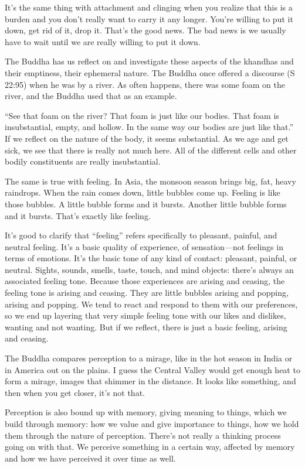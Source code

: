 It’s the same thing with attachment and clinging when you realize that
this is a burden and you don’t really want to carry it any longer.
You’re willing to put it down, get rid of it, drop it. That’s the good
news. The bad news is we usually have to wait until we are really
willing to put it down.

The Buddha has us reflect on and investigate these aspects of the
khandhas and their emptiness, their ephemeral nature. The Buddha once
offered a discourse (S 22:95) when he was by a river. As often happens,
there was some foam on the river, and the Buddha used that as an
example.

“See that foam on the river? That foam is just like our bodies. That
foam is insubstantial, empty, and hollow. In the same way our bodies are
just like that.” If we reflect on the nature of the body, it seems
substantial. As we age and get sick, we see that there is really not
much here. All of the different cells and other bodily constituents are
really insubstantial.

The same is true with feeling. In Asia, the monsoon season brings big,
fat, heavy raindrops. When the rain comes down, little bubbles come up.
Feeling is like those bubbles. A little bubble forms and it bursts.
Another little bubble forms and it bursts. That’s exactly like feeling.

It’s good to clarify that “feeling” refers specifically to pleasant,
painful, and neutral feeling. It’s a basic quality of experience, of
sensation—not feelings in terms of emotions. It’s the basic tone of any
kind of contact: pleasant, painful, or neutral. Sights, sounds, smells,
taste, touch, and mind objects: there’s always an associated feeling
tone. Because those experiences are arising and ceasing, the feeling
tone is arising and ceasing. They are little bubbles arising and
popping, arising and popping. We tend to react and respond to them with
our preferences, so we end up layering that very simple feeling tone
with our likes and dislikes, wanting and not wanting. But if we reflect,
there is just a basic feeling, arising and ceasing.

The Buddha compares perception to a mirage, like in the hot season in
India or in America out on the plains. I guess the Central Valley would
get enough heat to form a mirage, images that shimmer in the distance.
It looks like something, and then when you get closer, it’s not that.

Perception is also bound up with memory, giving meaning to things, which
we build through memory: how we value and give importance to things, how
we hold them through the nature of perception. There’s not really a
thinking process going on with that. We perceive something in a certain
way, affected by memory and how we have perceived it over time as well.

